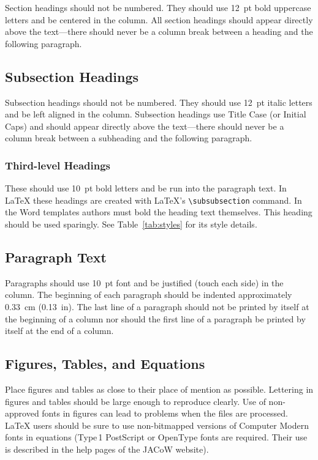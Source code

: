 \documentclass[letterpaper,
               nospread,     %
               ]{jacow}
\begin{document}
Section headings should not be numbered. They should
use  \SI{12}{pt}  bold  uppercase  letters  and  be  centered  in  the
column. All section headings should appear directly above
the text---there should never be a column break between a heading and the
following paragraph.

\subsection{Subsection Headings}

Subsection  headings  should  not  be  numbered.
They should use \SI{12}{pt} italic letters and be left aligned in the column.
Subsection headings use Title Case (or Initial Caps)
and should appear directly above the text---there should never be a column break
between a subheading and the following paragraph.

\subsubsection{Third-level Headings} These should use \SI{10}{pt} bold
letters and be run into the paragraph text. In \LaTeX{} these headings are
created with \LaTeX's \verb|\subsubsection| command.
In the Word templates authors must bold the heading text themselves.
This heading should be used sparingly. See Table~\ref{tab:styles}
for its style details.

\subsection{Paragraph Text}

Paragraphs should use \SI{10}{pt} font and be justified (touch each side) in
the column. The beginning of each paragraph should be indented
approximately \SI{0.33}{cm} (\SI{0.13}{in}). The last line of a paragraph should not be
printed by itself at the beginning of a column nor should the first line of
a paragraph be printed by itself at the end of a column.

\subsection{Figures, Tables, and Equations}

Place figures and tables as close to their place of mention as
possible. Lettering in figures and tables should be large enough to
reproduce clearly. Use of non-approved fonts in figures can lead to
problems when the files are processed. \LaTeX{} users should be sure to use
non-bitmapped versions of Computer Modern fonts in equations (Type\,1 PostScript
or OpenType fonts are required. Their use is described in the help 
pages of the JACoW website\cite{jacow-help}).
\end{document}
